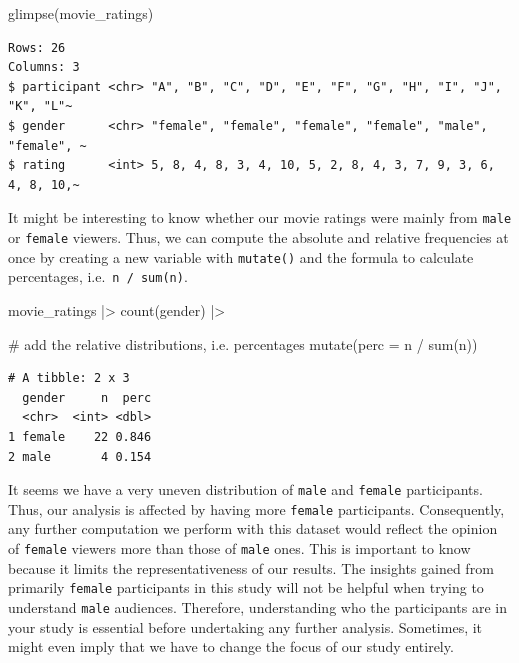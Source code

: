 \documentclass[
  letterpaper,
]{krantz}
\makeatletter
\newenvironment{Shaded}{\begin{snugshade}}{\end{snugshade}}
\newcommand{\AttributeTok}[1]{\textcolor[rgb]{0.40,0.45,0.13}{#1}}
\newcommand{\CommentTok}[1]{\textcolor[rgb]{0.37,0.37,0.37}{#1}}
\newcommand{\FunctionTok}[1]{\textcolor[rgb]{0.28,0.35,0.67}{#1}}
\newcommand{\NormalTok}[1]{\textcolor[rgb]{0.00,0.23,0.31}{#1}}
\newcommand{\SpecialCharTok}[1]{\textcolor[rgb]{0.37,0.37,0.37}{#1}}
\newenvironment{kframe}{%
\medskip{}
\setlength{\fboxsep}{.8em}
 \def\at@end@of@kframe{}%
 \ifinner\ifhmode%
  \def\at@end@of@kframe{\end{minipage}}%
  \begin{minipage}{\columnwidth}%
 \fi\fi%
 \def\FrameCommand##1{\hskip\@totalleftmargin \hskip-\fboxsep
 \colorbox{shadecolor}{##1}\hskip-\fboxsep
     \hskip-\linewidth \hskip-\@totalleftmargin \hskip\columnwidth}%
 \MakeFramed {\advance\hsize-\width
   \@totalleftmargin\z@ \linewidth\hsize
   \@setminipage}}%
 {\par\unskip\endMakeFramed%
 \at@end@of@kframe}
\renewenvironment{Shaded}{\begin{kframe}}{\end{kframe}}
\makeatother
\begin{document}
\begin{Shaded}
\begin{Highlighting}[]
\FunctionTok{glimpse}\NormalTok{(movie\_ratings)}
\end{Highlighting}
\end{Shaded}

\begin{verbatim}
Rows: 26
Columns: 3
$ participant <chr> "A", "B", "C", "D", "E", "F", "G", "H", "I", "J", "K", "L"~
$ gender      <chr> "female", "female", "female", "female", "male", "female", ~
$ rating      <int> 5, 8, 4, 8, 3, 4, 10, 5, 2, 8, 4, 3, 7, 9, 3, 6, 4, 8, 10,~
\end{verbatim}

It might be interesting to know whether our movie ratings were mainly
from \texttt{male} or \texttt{female} viewers. Thus, we can compute the
absolute and relative frequencies at once by creating a new variable
with \texttt{mutate()} and the formula to calculate percentages,
i.e.~\texttt{n\ /\ sum(n)}.

\begin{Shaded}
\begin{Highlighting}[]
\NormalTok{movie\_ratings }\SpecialCharTok{|\textgreater{}}
  \FunctionTok{count}\NormalTok{(gender) }\SpecialCharTok{|\textgreater{}}
  
  \CommentTok{\# add the relative distributions, i.e. percentages}
  \FunctionTok{mutate}\NormalTok{(}\AttributeTok{perc =}\NormalTok{ n }\SpecialCharTok{/} \FunctionTok{sum}\NormalTok{(n))}
\end{Highlighting}
\end{Shaded}

\begin{verbatim}
# A tibble: 2 x 3
  gender     n  perc
  <chr>  <int> <dbl>
1 female    22 0.846
2 male       4 0.154
\end{verbatim}

It seems we have a very uneven distribution of \texttt{male} and
\texttt{female} participants. Thus, our analysis is affected by having
more \texttt{female} participants. Consequently, any further computation
we perform with this dataset would reflect the opinion of
\texttt{female} viewers more than those of \texttt{male} ones. This is
important to know because it limits the representativeness of our
results. The insights gained from primarily \texttt{female} participants
in this study will not be helpful when trying to understand
\texttt{male} audiences. Therefore, understanding who the participants
are in your study is essential before undertaking any further analysis.
Sometimes, it might even imply that we have to change the focus of our
study entirely.
\end{document}
